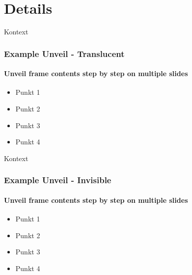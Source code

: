 \section{Details}

\begin{frame}{Kontext}
        \frametitle{Example Unveil - Translucent}
		\framesubtitle{Unveil frame contents step by step on multiple slides}
        \begin{itemize}
        \item Punkt 1
        \item<2-> Punkt 2
        \item<3-3> Punkt 3
        \item<4-> Punkt 4
        \end{itemize}
\end{frame}

\begin{frame}{Kontext}
        \frametitle{Example Unveil - Invisible}
		\framesubtitle{Unveil frame contents step by step on multiple slides}
        \begin{itemize}
        \item Punkt 1
        \item<2-> Punkt 2
        \item<3-3> Punkt 3
        \item<4-> Punkt 4
        \end{itemize}
\end{frame}

